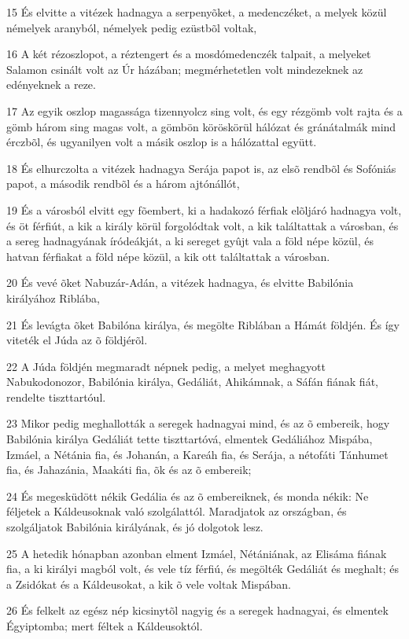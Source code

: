 \par 15 És elvitte a vitézek hadnagya a serpenyõket, a medenczéket, a melyek közül némelyek aranyból, némelyek pedig ezüstbõl voltak,
\par 16 A két rézoszlopot, a réztengert és a mosdómedenczék talpait, a melyeket Salamon csinált volt az Úr házában; megmérhetetlen volt mindezeknek az edényeknek a reze.
\par 17 Az egyik oszlop magassága tizennyolcz sing volt, és egy rézgömb volt rajta és a gömb három sing magas volt, a gömbön köröskörül hálózat és gránátalmák mind érczbõl, és ugyanilyen volt a másik oszlop is a hálózattal együtt.
\par 18 És elhurczolta a vitézek hadnagya Serája papot is, az elsõ rendbõl és Sofóniás papot, a második rendbõl és a három ajtónállót,
\par 19 És a városból elvitt egy fõembert, ki a hadakozó férfiak elõljáró hadnagya volt, és öt férfiút, a kik a király körül forgolódtak volt, a kik találtattak a városban, és a sereg hadnagyának íródeákját, a ki sereget gyûjt vala a föld népe közül, és hatvan férfiakat a föld népe közül, a kik ott találtattak a városban.
\par 20 És vevé õket Nabuzár-Adán, a vitézek hadnagya, és elvitte Babilónia királyához Riblába,
\par 21 És levágta õket Babilóna királya, és megölte Riblában a Hámát földjén. És így viteték el Júda az õ földjérõl.
\par 22 A Júda földjén megmaradt népnek pedig, a melyet meghagyott Nabukodonozor, Babilónia királya, Gedáliát, Ahikámnak, a Sáfán fiának fiát, rendelte tiszttartóul.
\par 23 Mikor pedig meghallották a seregek hadnagyai mind, és az õ embereik, hogy Babilónia királya Gedáliát tette tiszttartóvá, elmentek Gedáliához Mispába, Izmáel, a Nétánia fia, és Johanán, a Kareáh fia, és Serája, a nétofáti Tánhumet fia, és Jahazánia, Maakáti fia, õk és az õ embereik;
\par 24 És megesküdött nékik Gedália és az õ embereiknek, és monda nékik: Ne féljetek a Káldeusoknak való szolgálattól. Maradjatok az országban, és szolgáljatok Babilónia királyának, és jó dolgotok lesz.
\par 25 A hetedik hónapban azonban elment Izmáel, Nétániának, az Elisáma fiának fia, a ki királyi magból volt, és vele tíz férfiú, és megölték Gedáliát és meghalt; és a Zsidókat és a Káldeusokat, a kik õ vele voltak Mispában.
\par 26 És felkelt az egész nép kicsinytõl nagyig és a seregek hadnagyai, és elmentek Égyiptomba; mert féltek a Káldeusoktól.
